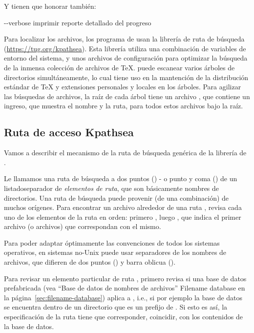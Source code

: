 \documentclass{article}
\begin{document}
Y  tienen que honorar también:
\begin{ttdescription}
\item[-{}-verbose] imprimir reporte detallado del progreso
\end{ttdescription}

Para localizar los archivos, los programa de \Webc{} usan la
librería de ruta de búsqueda \KPS{}
(\url{https://tug.org/kpathsea}). Esta librería utiliza una
combinación de variables de entorno del sistema, y unos
archivos de configuración para optimizar la búsqueda de la inmensa
colección de archivos de \TeX{}. \Webc{} puede escanear varios
árboles de directorios simultáneamente, lo cual tiene uso en
la mantención de la distribución estándar de \TeX{} y
extensiones personales y locales en los árboles. Para agilizar
las búsquedas de archivos, la raíz de cada árbol tiene un
archivo , que contiene un ingreso, que muestra el
nombre y la ruta, para todos estos archivos bajo la raíz. 

\subsection{Ruta de acceso Kpathsea}
\label{sec:kpathsea}

Vamos a describir el mecanismo de la ruta de búsqueda genérica
de la librería de \KPS{}.

Le llamamos una ruta de búsqueda a dos puntos (\samp{:})
- o punto y coma (\samp{;}) de un
listado\hyph separador de \emph{elementos de ruta}, que son
básicamente nombres de directorios. Una ruta de búsqueda puede
provenir (de una combinación) de muchos orígenes. Para
encontrar un archivo  alrededor de una ruta
, \KPS{} revisa cada uno de los elementos de la
ruta en orden: primero , luego
, que indica el primer archivo (o
archivos) que correspondan con el mismo. 

Para poder adaptar óptimamente las convenciones de todos los
sistemas operativos, en sistemas no-Unix \KPS{} puede usar
separadores de los nombres de archivos, que difieren de dos puntos
(\samp{:}) y barra oblicua (\samp{/}). 

Para revisar un elemento particular de ruta , \KPS{}
primero revisa si una base de datos prefabricada (vea ``Base
de datos de nombres de archivos'' Filename data\-base en la
página~\ref{sec:filename-database}) aplica a , i.e., si por
ejemplo la base de datos se encuentra dentro de un directorio que
es un prefijo de . Si esto es así, la especificación de la
ruta tiene que corresponder, coincidir, con los contenidos de la base
de datos.
\end{document}
